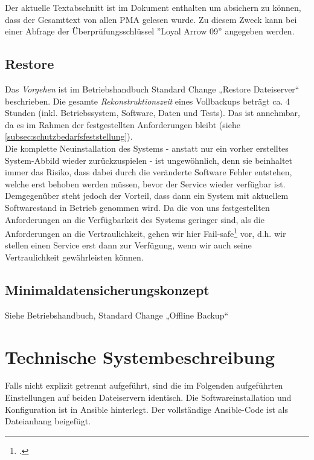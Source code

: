 Der aktuelle Textabschnitt ist im Dokument enthalten um absichern zu können, dass der Gesamttext von allen PMA gelesen wurde. Zu diesem Zweck kann bei einer Abfrage der Überprüfungsschlüssel ''Loyal Arrow 09'' angegeben werden.
\subsection{Restore}
\label{subsec:restore}
Das \emph{Vorgehen} ist im Betriebshandbuch Standard Change „Restore Dateiserver“ beschrieben. Die gesamte \emph{Rekonstruktionszeit} eines Vollbackups beträgt ca. 4 Stunden (inkl. Betriebssystem, Software, Daten und Tests). Das ist annehmbar, da es im Rahmen der festgestellten Anforderungen bleibt (siehe \ref{subsec:schutzbedarfsfeststellung}). \\

Die komplette Neuinstallation des Systems - anstatt nur ein vorher erstelltes System-Abbild wieder zurückzuspielen - ist ungewöhnlich, denn sie beinhaltet immer das Risiko, dass dabei durch die veränderte Software Fehler entstehen, welche erst behoben werden müssen, bevor der Service wieder verfügbar ist. Demgegenüber steht jedoch der Vorteil, dass dann ein System mit aktuellem Softwarestand in Betrieb genommen wird. Da die von uns festgestellten Anforderungen an die Verfügbarkeit des Systems geringer sind, als die Anforderungen an die Vertraulichkeit, gehen wir hier Fail-safe\footcite{wikiFailsafe} vor, d.h. wir stellen einen Service erst dann zur Verfügung, wenn wir auch seine Vertraulichkeit gewährleisten können.

\subsection{Minimaldatensicherungskonzept}
Siehe Betriebshandbuch, Standard Change „Offline Backup“

\newpage
\section{Technische Systembeschreibung}
\label{sec:techsys}
Falls nicht explizit getrennt aufgeführt, sind die im Folgenden aufgeführten Einstellungen auf beiden Dateiservern identisch. Die Softwareinstallation und Konfiguration ist in Ansible hinterlegt. Der vollständige Ansible-Code ist als Dateianhang beigefügt.


